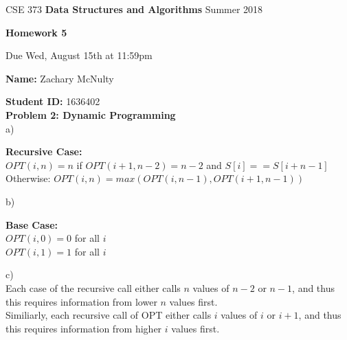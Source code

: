 \documentclass[12pt,a4paper]{article}
\begin{document}
%
%
\begin{center}
CSE 373    \hspace{0.4 cm}  
{\bf Data Structures and Algorithms }
  \hspace{0.4 cm}   Summer 2018
\end{center} 
\vspace{-7 mm}
\noindent \hrulefill
\vspace{3 mm}


%
%

\begin{center}
{\bf \Large Homework 5}

Due Wed, August 15th at 11:59pm
\end{center}


{\bf Name:} Zachary McNulty

{\bf Student ID:} 1636402\\

%
%

{\bf\large Problem 2: Dynamic Programming}\\

a) \\
\begin{center}
\textbf{Recursive Case: }\\
$OPT(i, n) = n$ if $OPT(i+1, n-2) = n-2$ and $S[i] == S[i+n-1]$\\
Otherwise: $OPT(i,n) = max\left( OPT(i, n-1), OPT(i+1, n-1)  \right)$\\

\end{center}

b) \\
\begin{center}
\textbf{Base Case:}\\
$OPT(i, 0) = 0$ for all $i$ \\
$OPT(i, 1) = 1$ for all $i$\\
\end{center}

c) \\

Each case of the recursive call either calls $n$ values of $n-2$ or $n-1$, and thus this requires information from lower $n$ values first. \\
Similiarly, each recursive call of OPT either calls $i$ values of $i$ or $i+1$, and thus this requires information from higher $i$ values first.\\
\end{document}
